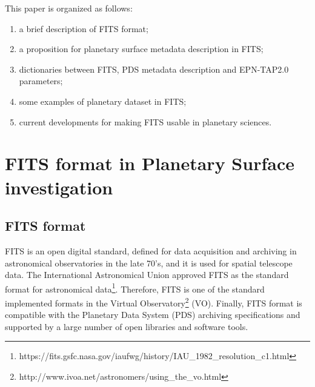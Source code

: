 This paper is organized as follows:
\begin{enumerate}
\item{a brief description of FITS format;}
\item{a proposition for planetary surface metadata description in FITS;}
\item{dictionaries between FITS, PDS metadata description and EPN-TAP2.0
parameters;}
\item{some examples of planetary dataset in FITS;}
\item{current developments for making FITS usable in planetary sciences.}
\end{enumerate}

\section{FITS format in Planetary Surface investigation}
\label{sec:fitspss}

\subsection{FITS format}
FITS is an open digital standard, defined for data acquisition and archiving
in astronomical observatories in the late 70's, and it is used for
spatial telescope data.
The International Astronomical Union approved FITS as the standard format
for astronomical data\footnote{https://fits.gsfc.nasa.gov/iaufwg/history/IAU\_1982\_resolution\_c1.html}. 
Therefore, FITS is one of the standard implemented formats in the Virtual
Observatory\footnote{http://www.ivoa.net/astronomers/using\_the\_vo.html}
(VO).
Finally, FITS format is compatible with the Planetary Data System (PDS)
archiving specifications and supported by a large number of open libraries
and software tools.

